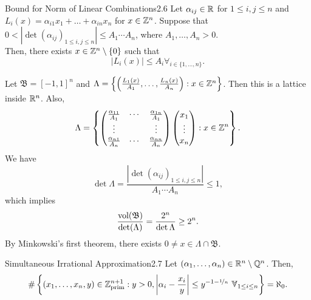 \documentclass{Vorlesungstemplate_English} %
\begin{document}
  \begin{corollary}{Bound for Norm of Linear Combinations}{2.6}
    Let $\alpha_{ij} \in \mathbb{R}$ for $1 \leq i,j \leq n$ and $L_i(x) = \alpha_{i1}x_1 + \dots + \alpha_{in}x_n$ for $x \in \mathbb{Z}^n$. Suppose that $0 < |\det(\alpha_{ij})_{1 \leq i,j \leq n}| \leq A_1\cdots A_n$, where $A_1, \dots, A_n > 0$. \\
    Then, there exists $x \in \mathbb{Z}^n \setminus \{ 0\}$ such that
    \[ |L_i(x)| \leq A_i \forall_{i \in \{ 1, \dots, n\}}.\]
  \end{corollary}
  \begin{pf}
    Let $\mathfrak{B} = [-1,1]^n$ and $\Lambda = \left\{ \left(\frac{L_1(x)}{A_1}, \dots, \frac{L_n(x)}{A_n}\right): x \in \mathbb{Z}^n\right\}$. Then this is a lattice inside $\mathbb{R}^n$. Also,
    \[ \Lambda = \left\{ \begin{pmatrix}
      \frac{\alpha_{11}}{A_1} & \cdots & \frac{\alpha_{1n}}{A_1} \\
      \vdots & & \vdots \\
      \frac{\alpha_{n1}}{A_n} & \cdots & \frac{\alpha_{nn}}{A_n}
    \end{pmatrix}\begin{pmatrix}
      x_1 \\
      \vdots \\
      x_n
    \end{pmatrix}: x \in \mathbb{Z}^n \right\}.\]
    We have
    \[ \det\Lambda = \frac{|\det(\alpha_{ij})_{1 \leq i,j \leq n}|}{A_1\cdots A_n} \leq 1,\]
    which implies
    \[ \frac{\text{vol}(\mathfrak{B})}{\det(\Lambda)} = \frac{2^n}{\det\Lambda} \geq 2^n.\]
    By Minkowski's first theorem, there exists $0 \neq x \in \Lambda \cap \mathfrak{B}$.
  \end{pf}
  \begin{corollary}{Simultaneous Irrational Approximation}{2.7}
    Let $(\alpha_1, \dots, \alpha_n) \in \mathbb{R}^n\setminus\mathbb{Q}^n$. Then,
    \[ \# \left\{ (x_1, \dots, x_n,y) \in \Zprim{n+1}: y >0, \left| \alpha_i-\frac{x_i}{y}\right| \leq y^{-1-\nicefrac{1}{n}} \forall_{1 \leq i \leq n}\right\} = \aleph_0.\]
  \end{corollary}
\end{document}

